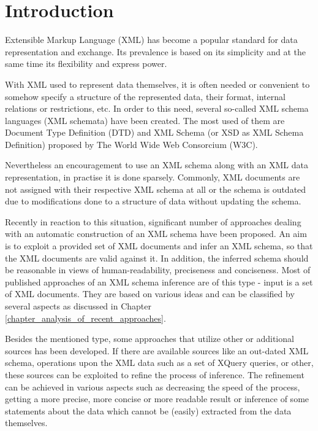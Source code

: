 \chapter{Introduction}
Extensible Markup Language (XML) \cite{Bray:08:EML} has become a popular standard for data representation and exchange. Its prevalence is based on its simplicity and at the same time its flexibility and express power.

With XML used to represent data themselves, it is often needed or convenient to somehow specify a structure of the represented data, their format, internal relations or restrictions, etc. In order to this need, several so-called XML schema languages (XML schemata) have been created. The most used of them are Document Type Definition (DTD) \cite{Bray:08:EML} and XML Schema (or XSD as XML Schema Definition) \cite{Walmsley:04:XSP, Thompson:04:XSP, Malhotra:04:XSP} proposed by The World Wide Web Consorcium (W3C).

Nevertheless an encouragement to use an XML schema along with an XML data representation, in practise it is done sparsely. Commonly, XML documents are not assigned with their respective XML schema at all or the schema is outdated due to modifications done to a structure of data without updating the schema.

Recently in reaction to this situation, significant number of approaches dealing with an automatic construction of an XML schema have been proposed. An aim is to exploit a provided set of XML documents and infer an XML schema, so that the XML documents are valid against it. In addition, the inferred schema should be reasonable in views of human-readability, preciseness and conciseness. Most of published approaches of an XML schema inference are of this type - input is a set of XML documents. They are based on various ideas and can be classified by several aspects as discussed in Chapter \ref{chapter_analysis_of_recent_approaches}.

Besides the mentioned type, some approaches that utilize other or additional sources has been developed. If there are available sources like an out-dated XML schema, operations upon the XML data such as a set of XQuery  queries, or other, these sources can be exploited to refine the process of inference. The refinement can be achieved in various aspects such as decreasing the speed of the process, getting a more precise, more concise or more readable result or inference of some statements about the data which cannot be (easily) extracted from the data themselves.

